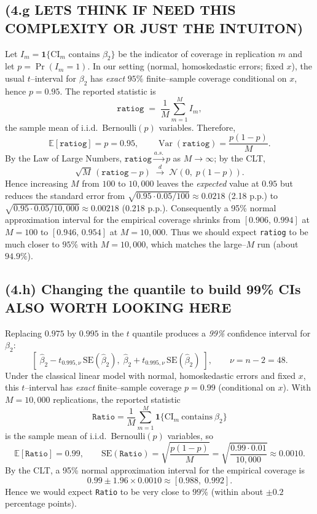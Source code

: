 \documentclass{article}
\begin{document}
\subsection*{(4.g LETS THINK IF NEED THIS COMPLEXITY OR JUST THE INTUITON)}

Let $I_m=\mathbf{1}\{\text{CI}_m \text{ contains } \beta_2\}$ be the indicator of
coverage in replication $m$ and let $p=\Pr(I_m=1)$. In our setting (normal,
homoskedastic errors; fixed $x$), the usual $t$–interval for $\beta_2$ has
\emph{exact} $95\%$ finite–sample coverage conditional on $x$, hence $p=0.95$.
The reported statistic is
\[
\texttt{ratiog} \;=\; \frac{1}{M}\sum_{m=1}^M I_m,
\]
the sample mean of i.i.d.\ Bernoulli$(p)$ variables. Therefore,
\[
\mathbb{E}[\texttt{ratiog}]=p=0.95,\qquad
\operatorname{Var}(\texttt{ratiog})=\frac{p(1-p)}{M}.
\]
By the Law of Large Numbers, $\texttt{ratiog}\xrightarrow{a.s.} p$ as $M\to\infty$;
by the CLT,
\[
\sqrt{M}\,(\texttt{ratiog}-p)\;\xrightarrow{d}\; \mathcal{N}\!\left(0,\;p(1-p)\right).
\]
Hence increasing $M$ from $100$ to $10{,}000$ leaves the \emph{expected} value at
$0.95$ but reduces the standard error from
$\sqrt{0.95\cdot0.05/100}\approx 0.0218$ (2.18 p.p.) to
$\sqrt{0.95\cdot0.05/10{,}000}\approx 0.00218$ (0.218 p.p.). Consequently a
95\% normal approximation interval for the empirical coverage shrinks from
$[0.906,\,0.994]$ at $M{=}100$ to $[0.946,\,0.954]$ at $M{=}10{,}000$. Thus we
should expect \texttt{ratiog} to be much closer to $95\%$ with $M{=}10{,}000$,
which matches the large–$M$ run (about $94.9\%$).

\subsection*{(4.h) Changing the quantile to build 99\% CIs ALSO WORTH LOOKING HERE}

Replacing $0.975$ by $0.995$ in the $t$ quantile produces a \emph{99\%} confidence
interval for $\beta_2$:
\[
\left[\;\widehat\beta_2 - t_{0.995,\nu}\,\mathrm{SE}(\widehat\beta_2),\;
       \widehat\beta_2 + t_{0.995,\nu}\,\mathrm{SE}(\widehat\beta_2)\;\right],
\qquad \nu = n-2 = 48 .
\]
Under the classical linear model with normal, homoskedastic errors and fixed $x$,
this $t$–interval has \emph{exact} finite–sample coverage $p=0.99$ (conditional on $x$).
With $M=10{,}000$ replications, the reported statistic
\[
\texttt{Ratio}=\frac{1}{M}\sum_{m=1}^{M}\mathbf{1}\{\text{CI}_m\ \text{contains}\ \beta_2\}
\]
is the sample mean of i.i.d.\ Bernoulli$(p)$ variables, so
\[
\mathbb{E}[\texttt{Ratio}]=0.99,\qquad
\mathrm{SE}(\texttt{Ratio})=\sqrt{\frac{p(1-p)}{M}}
=\sqrt{\frac{0.99\cdot0.01}{10{,}000}}\approx 0.0010 .
\]
By the CLT, a 95\% normal approximation interval for the empirical coverage is
\[
0.99 \pm 1.96\times 0.0010 \approx [0.988,\;0.992].
\]
Hence we would expect \texttt{Ratio} to be very close to $99\%$ (within about $\pm0.2$ percentage points).
\end{document}
